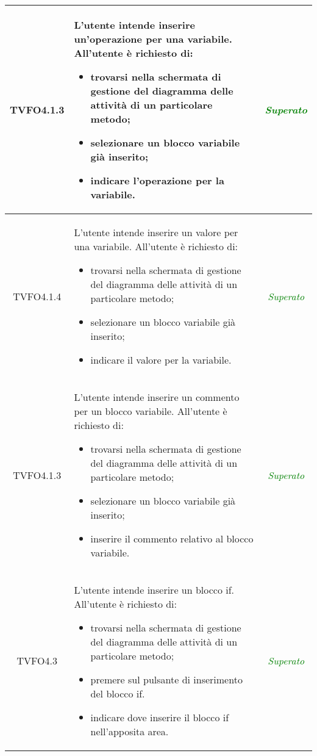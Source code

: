 \begin{longtable}{|c|>{}m{8cm}|c|}
\hypertarget{TVFO4.1.3}{TVFO4.1.3} & L'utente intende inserire un'operazione per una variabile.
All'utente è richiesto di:
\begin{itemize}
	\item trovarsi nella schermata di gestione del diagramma delle attività di un particolare metodo;
	\item selezionare un blocco variabile già inserito;
	\item indicare l'operazione per la variabile.
\end{itemize} & \textcolor{Green}{\textit{Superato}}\\ \hline

\hypertarget{TVFO4.1.4}{TVFO4.1.4} & L'utente intende inserire un valore per una variabile.
All'utente è richiesto di:
\begin{itemize}
	\item trovarsi nella schermata di gestione del diagramma delle attività di un particolare metodo;
	\item selezionare un blocco variabile già inserito;
	\item indicare il valore per la variabile.
\end{itemize} & \textcolor{Green}{\textit{Superato}}\\ \hline


\hypertarget{TVFO4.1.3}{TVFO4.1.3} & L'utente intende inserire un commento per un blocco variabile.
All'utente è richiesto di:
\begin{itemize}
	\item trovarsi nella schermata di gestione del diagramma delle attività di un particolare metodo;
	\item selezionare un blocco variabile già inserito;
	\item inserire il commento relativo al blocco variabile.
\end{itemize} & \textcolor{Green}{\textit{Superato}}\\ \hline

\hypertarget{TVFO4.3}{TVFO4.3} & L'utente intende inserire un blocco if.
All'utente è richiesto di:
\begin{itemize}
	\item trovarsi nella schermata di gestione del diagramma delle attività di un particolare metodo;
	\item premere sul pulsante di inserimento del blocco if.
	\item indicare dove inserire il blocco if nell'apposita area.
\end{itemize} & \textcolor{Green}{\textit{Superato}}\\ \hline


\end{longtable}
